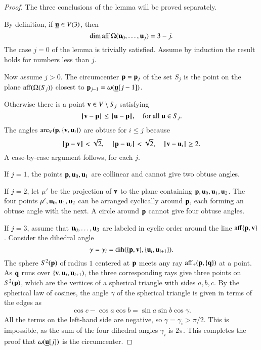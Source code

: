 \begin{proof} The three conclusions of the lemma will be proved separately.

%
 By definition, if ${\underline{{\mathbf u}}}\in V(3)$, then
$$\operatorname{dim\,aff}\Omega( {\mathbf u}_0,\ldots, {\mathbf u}_j) = 3-j.$$  The case $j=0$ of the lemma is trivially
satisfied.  Assume by induction the result holds for numbers less than $j$.

Now assume $j>0$.
The circumcenter ${\mathbf p}={\mathbf p}_{j}$ of the set $S_{j}$ is the point on the plane ${\operatorname{aff}}(\Omega(S_{j}))$
closest to ${\mathbf p}_{j-1}=\omega({\underline{{\mathbf u}}}[j-1])$.  

   Otherwise
there is a point ${\mathbf v}\in V\setminus S_j$ satisfying
\begin{equation}\label{eqn:closest}
{\hskip0.1em|\hskip-0.15em|\hskip0.1em}{\mathbf v} - {\mathbf p}{\hskip0.1em|\hskip-0.15em|\hskip0.1em}\le {\hskip0.1em|\hskip-0.15em|\hskip0.1em} {\mathbf u} - {\mathbf p}{\hskip0.1em|\hskip-0.15em|\hskip0.1em}, \quad\text{for all }  {\mathbf u}\in S_j.
\end{equation}
The angles $\operatorname{arc}_V({\mathbf p},\{{\mathbf v}, {\mathbf u}_i\})$ are obtuse for $i\le j$ because
$$
{\hskip0.1em|\hskip-0.15em|\hskip0.1em}{\mathbf p} - {\mathbf v}{\hskip0.1em|\hskip-0.15em|\hskip0.1em} < \sqrt2,\quad {\hskip0.1em|\hskip-0.15em|\hskip0.1em}{\mathbf p} -  {\mathbf u}_i{\hskip0.1em|\hskip-0.15em|\hskip0.1em} <\sqrt2,\quad {\hskip0.1em|\hskip-0.15em|\hskip0.1em}{\mathbf v} -  {\mathbf u}_i{\hskip0.1em|\hskip-0.15em|\hskip0.1em} \ge 2.
$$ 
A case-by-case argument follows, for each $j$.

If $j=1$, the points ${\mathbf p}, {\mathbf u}_0, {\mathbf u}_1$ are collinear and cannot give two obtuse angles.

If $j=2$, let $\mu'$ be the projection of ${\mathbf v}$ to the plane containing
${\mathbf p}, {\mathbf u}_0, {\mathbf u}_1, {\mathbf u}_2$. The four points $\mu', {\mathbf u}_0, {\mathbf u}_1, {\mathbf u}_2$ can be arranged
cyclically around ${\mathbf p}$, each forming an obtuse angle with the next.  A circle around ${\mathbf p}$
cannot give four obtuse angles.


If $j=3$, assume that $ {\mathbf u}_0,\ldots, {\mathbf u}_3$ are labeled in cyclic order around the line
${\operatorname{aff}}\{{\mathbf p},{\mathbf v}\}$.  Consider the dihedral angle 
  $$
  \gamma=\gamma_i=\operatorname{dih}(\{{\mathbf p},{\mathbf v}\},\{ {\mathbf u}_i, {\mathbf u}_{i+1}\}).
  $$
The sphere $S^2({\mathbf p})$ of radius $1$ centered at ${\mathbf p}$ meets any ray
${\operatorname{aff}}_+({\mathbf p},\{{\mathbf q}\})$ at a point.   As ${\mathbf q}$ runs over $\{{\mathbf v}, {\mathbf u}_i, {\mathbf u}_{i+1})$,  the three corresponding rays give three points on $S^2({\mathbf p})$, which are the vertices of a spherical triangle with sides $a,b,c$.  By the spherical law of cosines, the angle $\gamma$ of the spherical triangle is given in terms of the edges as
$$
  \cos c - \cos a \cos b = \sin a \sin b \cos \gamma.
$$
All the terms on the left-hand side are negative, so $\gamma =\gamma_i > \pi/2$.
This is impossible, as the sum of the four dihedral angles $\gamma_i$ is $2\pi$.
This completes the proof that $\omega({\underline{{\mathbf u}}}[j])$ is the circumcenter.


\end{proof}
